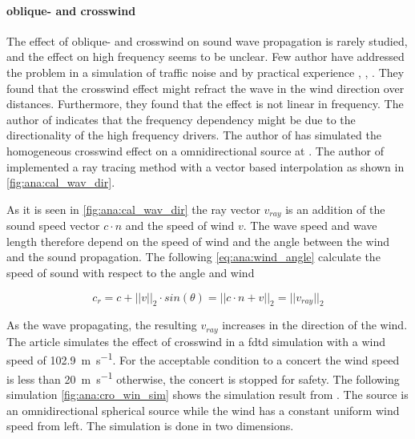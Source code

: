 \paragraph{oblique- and crosswind} The effect of oblique- and crosswind on sound wave propagation is rarely studied, and the effect on high frequency seems to be unclear. Few author have addressed the problem in a simulation of traffic noise and by practical experience \citep{effect_of_wind}, \citep{crosswind_effect_2016}, \citep{BALLOU2008xi}. They found that the crosswind effect might refract the wave in the wind direction over distances. Furthermore, they found that the effect is not linear in frequency. The author of \citep{BALLOU2008xi} indicates that the frequency dependency might be due to the directionality of the high frequency drivers. The author of \citep{crosswind_simulation} has simulated the homogeneous crosswind effect on a omnidirectional source at . The author of \citep{ray_tracing} implemented a ray tracing method with a vector based interpolation as shown in \autoref{fig:ana:cal_wav_dir}.



\startexplain
{}
\stopexplain

As it is seen in \autoref{fig:ana:cal_wav_dir} the ray vector $v_{ray}$ is an addition of the sound speed vector $c \cdot n$ and the speed of wind $v$. The wave speed and wave length therefore depend on the speed of wind and the angle between the wind and the sound propagation. The following \autoref{eq:ana:wind_angle} calculate the speed of sound with respect to the angle and wind 


\begin{equation}\label{eq:ana:wind_angle}
c_r = c+||v||_2 \cdot sin(\theta) = ||c \cdot n + v||_2 = ||v_{ray}||_2
\end{equation}

\startexplain
{}
\stopexplain



As the wave propagating, the resulting $v_{ray}$ increases in the direction of the wind. The article \citep{crosswind_simulation} simulates the effect of crosswind in a \gls{fdtd} simulation with a wind speed of \SI{102.9}{\meter\per\second}. For the acceptable condition to a concert the wind speed is less than \SI{20}{\meter\per\second} otherwise, the concert is stopped for safety. The following simulation \autoref{fig:ana:cro_win_sim} shows the simulation result from \citep{crosswind_simulation}. The source is an omnidirectional  spherical source while the wind has a constant uniform wind speed from left. The simulation is done in two dimensions. 


